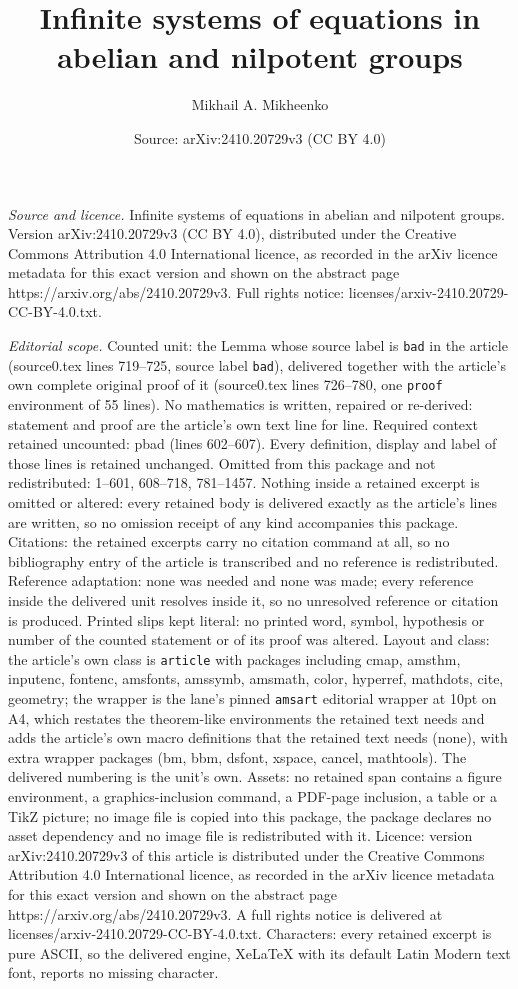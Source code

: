 \documentclass[10pt,a4paper]{amsart}
\title[Infinite systems of equations in abelian and nilpotent group]{Infinite systems of equations in abelian and nilpotent groups}
\author{Mikhail A. Mikheenko}
\date{Source: arXiv:2410.20729v3 (CC BY 4.0)}
\begin{document}
\maketitle

\noindent\emph{Source and licence.} Infinite systems of equations in abelian and nilpotent groups. Version arXiv:2410.20729v3 (CC BY 4.0), distributed under the Creative Commons Attribution 4.0 International licence, as recorded in the arXiv licence metadata for this exact version and shown on the abstract page https://arxiv.org/abs/2410.20729v3. Full rights notice: licenses/arxiv-2410.20729-CC-BY-4.0.txt.\par\smallskip

\noindent\textit{Editorial scope.} Counted unit: the Lemma whose source label is \texttt{bad} in the article (source0.tex lines 719--725, source label \texttt{bad}), delivered together with the article's own complete original proof of it (source0.tex lines 726--780, one \texttt{proof} environment of 55 lines). No mathematics is written, repaired or re-derived: statement and proof are the article's own text line for line. Required context retained uncounted: pbad (lines 602--607). Every definition, display and label of those lines is retained unchanged. Omitted from this package and not redistributed: 1--601, 608--718, 781--1457. Nothing inside a retained excerpt is omitted or altered: every retained body is delivered exactly as the article's lines are written, so no omission receipt of any kind accompanies this package. Citations: the retained excerpts carry no citation command at all, so no bibliography entry of the article is transcribed and no reference is redistributed. Reference adaptation: none was needed and none was made; every reference inside the delivered unit resolves inside it, so no unresolved reference or citation is produced. Printed slips kept literal: no printed word, symbol, hypothesis or number of the counted statement or of its proof was altered. Layout and class: the article's own class is \texttt{article} with packages including cmap, amsthm, inputenc, fontenc, amsfonts, amssymb, amsmath, color, hyperref, mathdots, cite, geometry; the wrapper is the lane's pinned \texttt{amsart} editorial wrapper at 10pt on A4, which restates the theorem-like environments the retained text needs and adds the article's own macro definitions that the retained text needs (none), with extra wrapper packages (bm, bbm, dsfont, xspace, cancel, mathtools). The delivered numbering is the unit's own. Assets: no retained span contains a figure environment, a graphics-inclusion command, a PDF-page inclusion, a table or a TikZ picture; no image file is copied into this package, the package declares no asset dependency and no image file is redistributed with it. Licence: version arXiv:2410.20729v3 of this article is distributed under the Creative Commons Attribution 4.0 International licence, as recorded in the arXiv licence metadata for this exact version and shown on the abstract page https://arxiv.org/abs/2410.20729v3. A full rights notice is delivered at licenses/arxiv-2410.20729-CC-BY-4.0.txt. Characters: every retained excerpt is pure ASCII, so the delivered engine, XeLaTeX with its default Latin Modern text font, reports no missing character.
\end{document}
